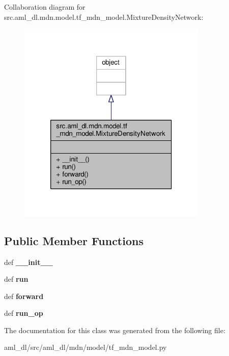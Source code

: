 Collaboration diagram for src.\-aml\-\_\-dl.\-mdn.\-model.\-tf\-\_\-mdn\-\_\-model.\-Mixture\-Density\-Network\-:
\nopagebreak
\begin{figure}[H]
\begin{center}
\leavevmode
\includegraphics[width=256pt]{classsrc_1_1aml__dl_1_1mdn_1_1model_1_1tf__mdn__model_1_1_mixture_density_network__coll__graph}
\end{center}
\end{figure}
\subsection*{Public Member Functions}
\begin{DoxyCompactItemize}
\item 
\hypertarget{classsrc_1_1aml__dl_1_1mdn_1_1model_1_1tf__mdn__model_1_1_mixture_density_network_a78f4413ba6b4ae4f2f9831ba57871fb8}{def {\bfseries \-\_\-\-\_\-init\-\_\-\-\_\-}}\label{classsrc_1_1aml__dl_1_1mdn_1_1model_1_1tf__mdn__model_1_1_mixture_density_network_a78f4413ba6b4ae4f2f9831ba57871fb8}

\item 
\hypertarget{classsrc_1_1aml__dl_1_1mdn_1_1model_1_1tf__mdn__model_1_1_mixture_density_network_a19614da0482bce85ea8a0996b9d71c7f}{def {\bfseries run}}\label{classsrc_1_1aml__dl_1_1mdn_1_1model_1_1tf__mdn__model_1_1_mixture_density_network_a19614da0482bce85ea8a0996b9d71c7f}

\item 
\hypertarget{classsrc_1_1aml__dl_1_1mdn_1_1model_1_1tf__mdn__model_1_1_mixture_density_network_a7691ed5a080aee0cb33b8438fb95648d}{def {\bfseries forward}}\label{classsrc_1_1aml__dl_1_1mdn_1_1model_1_1tf__mdn__model_1_1_mixture_density_network_a7691ed5a080aee0cb33b8438fb95648d}

\item 
\hypertarget{classsrc_1_1aml__dl_1_1mdn_1_1model_1_1tf__mdn__model_1_1_mixture_density_network_a893b1268d75cbe5afbc2ede49499034e}{def {\bfseries run\-\_\-op}}\label{classsrc_1_1aml__dl_1_1mdn_1_1model_1_1tf__mdn__model_1_1_mixture_density_network_a893b1268d75cbe5afbc2ede49499034e}

\end{DoxyCompactItemize}


The documentation for this class was generated from the following file\-:\begin{DoxyCompactItemize}
\item 
aml\-\_\-dl/src/aml\-\_\-dl/mdn/model/tf\-\_\-mdn\-\_\-model.\-py\end{DoxyCompactItemize}

